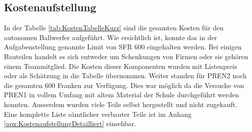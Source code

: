 \subsection{Kostenaufstellung}
In der Tabelle \ref{tab:KostenTabelleKurz} sind die gesamten Kosten für den autonomen 
Ballwerfer aufgeführt. Wie ersichtlich ist, konnte das in der Aufgabenstellung genannte 
Limit von SFR 600 eingehalten werden. Bei einigen Bauteilen handelt es sich entweder um Schenkungen von Firmen 
oder sie gehören einem Teammitglied. Die Kosten dieser Komponenten wurden mit Listenpreis 
oder als Schätzung in die Tabelle übernommen. Weiter standen für PREN2 noch die gesamten 
600 Franken zur Verfügung. Dies war möglich da die Versuche von PREN1 in vollem Umfang 
mit altem Material der Schule durchgeführt werden konnten. Ausserdem wurden viele Teile selbst 
hergestellt und nicht zugekauft. Eine komplette Liste sämtlicher verbauter Teile ist 
im Anhang \ref{apx:KostenaufstellungDetailliert} einsehbar.

